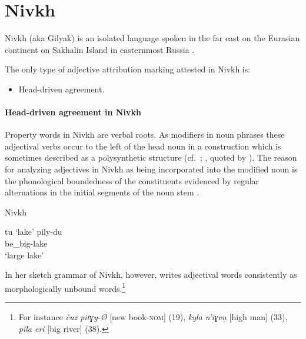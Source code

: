 \section{Nivkh}
Nivkh (aka Gilyak) is an isolated language spoken in the far east on the Eurasian continent on Sakhalin Island in easternmost Russia \citep[222–223]{salminen2007}.

The only type of adjective attribution marking attested in Nivkh is:
\begin{itemize}
\item Head-driven agreement.
\end{itemize}

\paragraph{Head-driven agreement in Nivkh}
Property words in Nivkh are verbal roots. As modifiers in noun phrases these adjectival verbs occur to the left of the head noun in a construction which is sometimes described as a polysynthetic structure (cf.~\citealt[16]{gruzdeva1998}; \citealt[80]{jakobson1971}, quoted by \citealt[138]{rijkhoff2002}). The reason for analyzing adjectives in Nivkh as being incorporated into the modified noun is the phonological boundedness of the constituents evidenced by regular alternations in the initial segments of the noun stem \cite[16]{gruzdeva1998}.
\begin{exe}
\ex \rm{Nivkh \citep[16]{gruzdeva1998}}
\begin{xlist}
\ex tu ‘lake’
\ex 
\gll	pily-du\\
	be\_big-lake\\
\glt	‘large lake’
\end{xlist}
\end{exe}
In her sketch grammar of Nivkh, however, \cite{gruzdeva1998} writes adjectival words consistently as morphologically unbound words.\footnote{For instance \textit{čuz pitɣy-Ø} [new book-\textsc{nom}] (19), \textit{kyla n'iɣvn̦} [high man] (33), \textit{pila eri} [big river] (38).}

